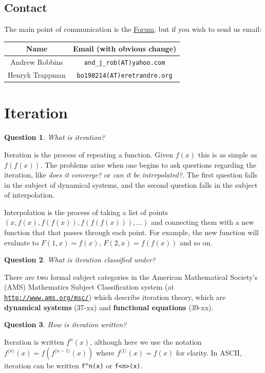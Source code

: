 \documentclass[12pt]{article}
\newtheorem{question}{Question}
\theoremstyle{definition}
\newcommand{\iter}[2]{{#1}^{\langle{#2}\rangle}}
\begin{document}
\subsection{Contact}
The main point of communication is the 
\href{http://math.eretrandre.org/tetrationforum/index.php}{Forum}, but if you wish to send us email:

\begin{center}
\begin{tabular}{|c|c|}
\hline
Name & Email (with obvious change) \\
\hline
Andrew Robbins & {\tt and\_j\_rob(AT)yahoo.com} \\
Henryk Trappman & {\tt bo198214(AT)eretrandre.org} \\
\hline
\end{tabular}
\end{center}


\section{Iteration}

\begin{question}
What is iteration?
\end{question}
Iteration is the process of repeating a function. Given $f(x)$ this is as simple as $f(f(x))$. The problems arise when one begins to ask questions regarding the iteration, like {\it does it converge?} or {\it can it be interpolated?}. The first question falls in the subject of dynamical systems, and the second question falls in the subject of interpolation.

Interpolation is the process of taking a list of points $(x, f(x), f(f(x)), f(f(f(x))), \ldots)$ and connecting them with a new function that that passes through each point. For example, the new function will evaluate to $F(1, x) = f(x)$, $F(2, x) = f(f(x))$ and so on. 

\begin{question}
What is iteration classified under?
\end{question}
There are two formal subject categories in the American Mathematical Society's (AMS) Mathematics Subject Classification system (at \href{http://www.ams.org/msc/}{\tt http://www.ams.org/msc/}) which describe iteration theory, which are {\bf dynamical systems} (37-xx) and {\bf functional equations} (39-xx). 

\begin{question}
How is iteration written?
\end{question}
Iteration is written $f^n(x)$, although here we use the notation $\iter{f}n(x) = f(\iter{f}{n-1}(x))$ where $\iter{f}1(x) = f(x)$ for clarity. In ASCII, iteration can be written {\tt f{\textasciicircum}n(x)} or {\tt f<n>(x)}.
\end{document}

